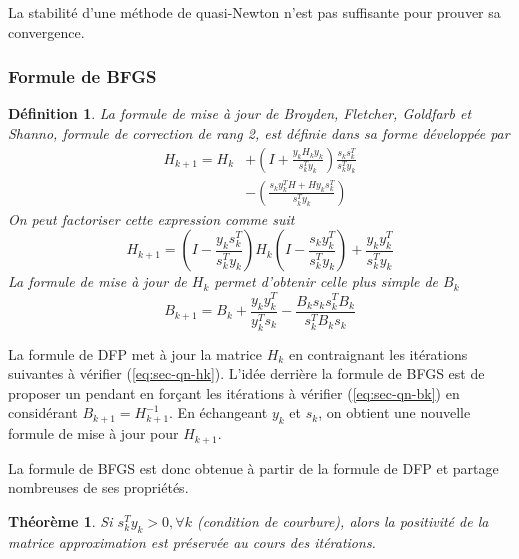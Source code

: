 \documentclass[3p, twocolumn]{elsarticle}
\newtheorem{thm}{Théorème}
\newtheorem{definition}{Définition}[section]
\begin{document}
\begin{rmk}
    La stabilité d'une méthode de quasi-Newton n'est pas suffisante pour prouver sa convergence.
\end{rmk}

\subsubsection{Formule de BFGS}
\begin{definition}
    La formule de mise à jour de Broyden, Fletcher, Goldfarb et Shanno, formule de correction de rang 2, est définie dans sa forme développée par 
    \begin{align}
        H_{k+1} = H_k &+ \left(I + \frac{y_k H_k y_k}{s_k^T y_k}\right)\frac{s_k s_k^T}{s_k^T y_k}\nonumber\\
        &-\left(\frac{s_k y_k^T H+ H y_k s_k^T}{s_k^T y_k}\right)
        \label{eq:bfgs-hk-developed}
    \end{align}
    On peut factoriser cette expression comme suit 
    \begin{equation}
        H_{k+1} = \left(I - \frac{y_k s_k^T}{s_k^T y_k}\right) H_k \left(I - \frac{s_k y_k^T}{s_k^Ty_k}\right) + \frac{y_k y_k^T}{s_k^T y_k}
        \label{eq:bfgs-hk-factorised}
    \end{equation}
    La formule de mise à jour de $H_k$ permet d'obtenir celle plus simple de $B_{k}$
    \begin{equation}
        B_{k+1} = B_k + \frac{y_ky_k^T}{y_k^Ts_k}-\frac{B_ks_ks_k^TB_k}{s_k^TB_ks_k}
        \label{eq:bfgs-bk}
    \end{equation}
\end{definition}

La formule de DFP met à jour la matrice $H_k$ en contraignant les itérations suivantes à vérifier (\ref{eq:sec-qn-hk}). L'idée derrière la formule de BFGS est de proposer un pendant en forçant les itérations à vérifier (\ref{eq:sec-qn-bk}) en considérant $B_{k+1} = H_{k+1}^{-1}$. En échangeant $y_k$ et $s_k$, on obtient une nouvelle formule de mise à jour pour $H_{k+1}$.

La formule de BFGS est donc obtenue à partir de la formule de DFP et partage nombreuses de ses propriétés. 

\begin{thm}
    Si $s_k^Ty_k > 0, \forall k$ (condition de courbure), alors la positivité de la matrice approximation est préservée au cours des itérations.
\end{thm}
\end{document}
